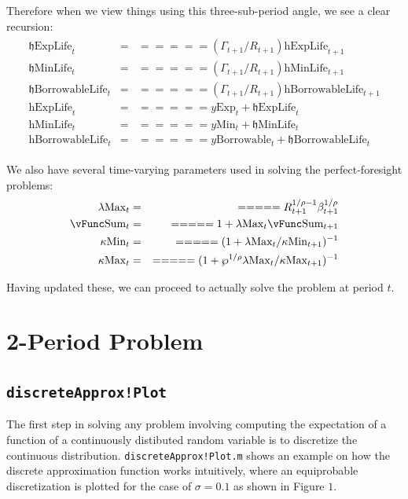 \documentclass[titlepage,abstract]{\econtex}
\providecommand{\lambdaMax}{\lambda\text{Max}}
\providecommand{\kappaMax}{\kappa\text{Max}}
\providecommand{\kappaMin}{\kappa\text{Min}}
\providecommand{\vSum}{\vFunc\text{Sum}}
\providecommand{\pUnem}{\wp}
\providecommand{\hExpLife}{\mathrm{h}\text{ExpLife}}
\providecommand{\hMinLife}{\mathrm{h}\text{MinLife}}
\providecommand{\hBorrowableLife}{\mathrm{h}\text{BorrowableLife}}
\providecommand{\hEndExpLife}{\mathfrak{h}\text{ExpLife}}
\providecommand{\hEndMinLife}{\mathfrak{h}\text{MinLife}}
\providecommand{\hEndBorrowableLife}{\mathfrak{h}\text{BorrowableLife}}
\providecommand{\yMin}{y\text{Min}}
\providecommand{\yBorrowable}{y\text{Borrowable}}
\providecommand{\yExp}{y\text{Exp}}
\begin{document}
Therefore when we view things using this three-sub-period angle, we see a clear recursion:
\begin{equation}\begin{gathered}\begin{aligned}
          \hEndExpLife_{t}      &=& =  =  =  =  =  (\Gamma_{t+1}/R_{t+1}) \hExpLife_{t+1} \\
          \hEndMinLife_{t}      &=& =  =  =  =  =  (\Gamma_{t+1}/R_{t+1}) \hMinLife_{t+1} \\
          \hEndBorrowableLife_{t}      &=& =  =  =  =  =  (\Gamma_{t+1}/R_{t+1}) \hBorrowableLife_{t+1} \\
          \hExpLife_{t}      &=& =  =  =  =  =  \yExp_{t} +\hEndExpLife_{t} \\
          \hMinLife_{t}      &=& =  =  =  =  =  \yMin_{t} +\hEndMinLife_{t} \\
          \hBorrowableLife_{t}      &=& =  =  =  =  =  \yBorrowable_{t} +\hEndBorrowableLife_{t}
\end{aligned}\end{gathered}\end{equation}

We also have several time-varying parameters used in solving the perfect-foresight problems:
          \begin{equation}\begin{gathered}\begin{aligned}
          \lambdaMax_{t}      &=& =  =  =  =  =  R_{t+1}^{1/\rho-1}\beta_{t+1}^{1/\rho} \\
          \vSum_{t}      &=& =  =  =  =  =  1+ \lambdaMax_{t} \vSum_{t+1} \\
          \kappaMin_{t}      &=& =  =  =  =  =  (1+\lambdaMax_{t}/\kappaMin_{t+1})^{-1} \\
          \kappaMax_{t}      &=& =  =  =  =  =  (1+\pUnem^{1/\rho}\lambdaMax_{t}/\kappaMax_{t+1})^{-1}
          \end{aligned}\end{gathered}\end{equation}

Having updated these, we can proceed to actually solve the problem at period $t$.
          
\section{2-Period Problem}
\subsection{\texttt{discreteApprox!Plot}}
The first step in solving any problem involving computing the expectation of a function of a continuously distibuted random variable is to discretize the continuous distribution. \texttt{discreteApprox!Plot.m} shows an example on how the discrete approximation function works intuitively, where an equiprobable discretization is plotted for the case of $\sigma= 0.1$ as shown in Figure $1$.
\end{document}
